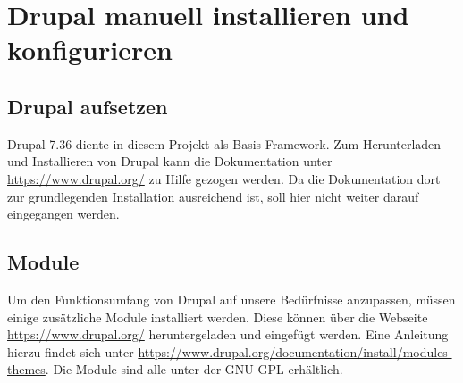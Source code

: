 \documentclass[a4paper,11pt,twoside]{article}
\begin{document}
\section{Drupal manuell installieren und konfigurieren}
\subsection{Drupal aufsetzen}

Drupal 7.36 diente in diesem Projekt als Basis-Framework. Zum Herunterladen
und Installieren von Drupal kann die Dokumentation unter
\url{https://www.drupal.org/} zu Hilfe gezogen werden. Da die Dokumentation
dort zur grundlegenden Installation ausreichend ist, soll hier nicht weiter
darauf eingegangen werden.

\subsection{Module}
Um den Funktionsumfang von Drupal auf unsere Bedürfnisse anzupassen, müssen
einige zusätzliche Module installiert werden. Diese können über die Webseite
\url{https://www.drupal.org/} heruntergeladen und eingefügt werden. Eine
Anleitung hierzu findet sich unter
\url{https://www.drupal.org/documentation/install/modules-themes}.  Die Module
sind alle unter der GNU GPL erhältlich.  
\end{document}
